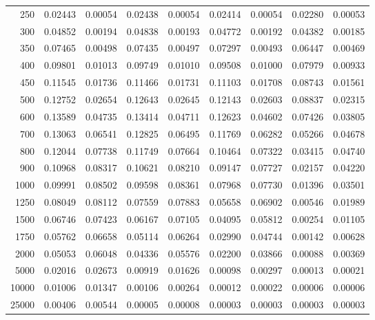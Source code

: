 \begin{table}[ht]
\begin{tabular}{r|c|c|c|c|c|c|c|c}
      250 & 0.02443 & 0.00054 & 0.02438 & 0.00054 & 0.02414 & 0.00054 & 0.02280 & 0.00053 \\
      300 & 0.04852 & 0.00194 & 0.04838 & 0.00193 & 0.04772 & 0.00192 & 0.04382 & 0.00185 \\
      350 & 0.07465 & 0.00498 & 0.07435 & 0.00497 & 0.07297 & 0.00493 & 0.06447 & 0.00469 \\
      400 & 0.09801 & 0.01013 & 0.09749 & 0.01010 & 0.09508 & 0.01000 & 0.07979 & 0.00933 \\
      450 & 0.11545 & 0.01736 & 0.11466 & 0.01731 & 0.11103 & 0.01708 & 0.08743 & 0.01561 \\
      500 & 0.12752 & 0.02654 & 0.12643 & 0.02645 & 0.12143 & 0.02603 & 0.08837 & 0.02315 \\
      600 & 0.13589 & 0.04735 & 0.13414 & 0.04711 & 0.12623 & 0.04602 & 0.07426 & 0.03805 \\
      700 & 0.13063 & 0.06541 & 0.12825 & 0.06495 & 0.11769 & 0.06282 & 0.05266 & 0.04678 \\
      800 & 0.12044 & 0.07738 & 0.11749 & 0.07664 & 0.10464 & 0.07322 & 0.03415 & 0.04740 \\
      900 & 0.10968 & 0.08317 & 0.10621 & 0.08210 & 0.09147 & 0.07727 & 0.02157 & 0.04220 \\
     1000 & 0.09991 & 0.08502 & 0.09598 & 0.08361 & 0.07968 & 0.07730 & 0.01396 & 0.03501 \\
     1250 & 0.08049 & 0.08112 & 0.07559 & 0.07883 & 0.05658 & 0.06902 & 0.00546 & 0.01989 \\
     1500 & 0.06746 & 0.07423 & 0.06167 & 0.07105 & 0.04095 & 0.05812 & 0.00254 & 0.01105 \\
     1750 & 0.05762 & 0.06658 & 0.05114 & 0.06264 & 0.02990 & 0.04744 & 0.00142 & 0.00628 \\
     2000 & 0.05053 & 0.06048 & 0.04336 & 0.05576 & 0.02200 & 0.03866 & 0.00088 & 0.00369 \\
     5000 & 0.02016 & 0.02673 & 0.00919 & 0.01626 & 0.00098 & 0.00297 & 0.00013 & 0.00021 \\
    10000 & 0.01006 & 0.01347 & 0.00106 & 0.00264 & 0.00012 & 0.00022 & 0.00006 & 0.00006 \\
    25000 & 0.00406 & 0.00544 & 0.00005 & 0.00008 & 0.00003 & 0.00003 & 0.00003 & 0.00003 \\ \cline{1-9}
    \end{tabular}
    \label{tab:XRayEffODE}
\end{table}
